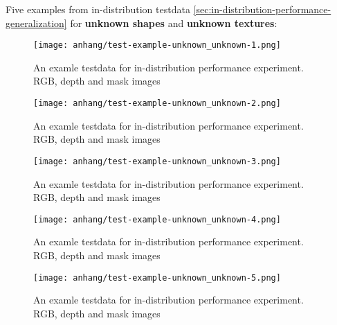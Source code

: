 	\FloatBarrier
	\clearpage
	Five examples from in-distribution testdata \ref{sec:in-distribution-performance-generalization} for \textbf{unknown shapes} and \textbf{unknown textures}:
	\begin{figure}[H]
		\centering
		\texttt{[image: anhang/test-example-unknown\_unknown-1.png]}
		\caption[An examle testdata for in-distribution performance experiment. RGB, depth and mask images]{An examle testdata for in-distribution performance experiment. RGB, depth and mask images}
	\end{figure}
	\begin{figure}[H]
		\centering
		\texttt{[image: anhang/test-example-unknown\_unknown-2.png]}
		\caption[An examle testdata for in-distribution performance experiment. RGB, depth and mask images]{An examle testdata for in-distribution performance experiment. RGB, depth and mask images}
	\end{figure}
	\begin{figure}[H]
		\centering
		\texttt{[image: anhang/test-example-unknown\_unknown-3.png]}
		\caption[An examle testdata for in-distribution performance experiment. RGB, depth and mask images]{An examle testdata for in-distribution performance experiment. RGB, depth and mask images}
	\end{figure}
	\begin{figure}[H]
		\centering
		\texttt{[image: anhang/test-example-unknown\_unknown-4.png]}
		\caption[An examle testdata for in-distribution performance experiment. RGB, depth and mask images]{An examle testdata for in-distribution performance experiment. RGB, depth and mask images}
	\end{figure}
	\begin{figure}[H]
		\centering
		\texttt{[image: anhang/test-example-unknown\_unknown-5.png]}
		\caption[An examle testdata for in-distribution performance experiment. RGB, depth and mask images]{An examle testdata for in-distribution performance experiment. RGB, depth and mask images}
	\end{figure}
	

	
